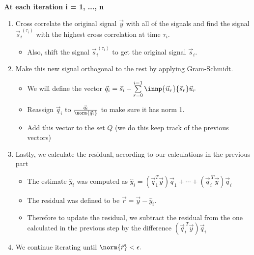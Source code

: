 \begin{enumerate}
{    \textbf{At each iteration i = 1, ..., n}
    \begin{enumerate}[label=(\arabic*)]
      \item Cross correlate the original signal $\vec{y}$ with all of the signals and find the signal $\vec{s}_{i}^{\ ({\tau_{i}})}$ with the highest cross correlation at time $\tau_{i}.$
      \begin{itemize}
        \item Also, shift the signal $\vec{s}_{i}^{\ (\tau_{i})}$ to get the original signal $\vec{s}_{i}.$
      \end{itemize}
      \item Make this new signal orthogonal to the rest by applying Gram-Schmidt. 
      \begin{itemize}
        \item We will define the vector $\vec{q}_{i} = \vec{s}_{i} - \sum\limits_{r = 0}^{i - 1} \innp{\vec{u}_{{r}}}{\vec{s}_{r}} \vec{u}_{r}$
        \item Reassign $\vec{q}_{i}$ to $\frac{\vec{q}_{i}}{\norm{\vec{q}_{i}}}$ to make sure it has norm 1.
        \item Add this vector to the set $Q$ (we do this keep track of the previous vectors)
      \end{itemize}
      \item Lastly, we calculate the residual, according to our calculations in the previous part
      \begin{itemize}
        \item The estimate $\hat{y}_{i}$ was computed as $\hat{y}_{i} = (\vec{q}_{1}^{T} \vec{y}) \vec{q}_{1} + \cdots + (\vec{q}_{i}^{\ T} \vec{y}) \vec{q}_{i}$
        \item The residual was defined to be $\vec{r} = \vec{y} - \hat{y}_{i}.$ 
        \item Therefore to update the residual, we subtract the residual from the one calculated in the previous step by the difference $(\vec{q}_{i}^{\ T} \vec{y}) \vec{q}_{i}$
      \end{itemize}
      \item We continue iterating until $\norm{\vec{r}} < \epsilon.$
    \end{enumerate}
  }
\end{enumerate}